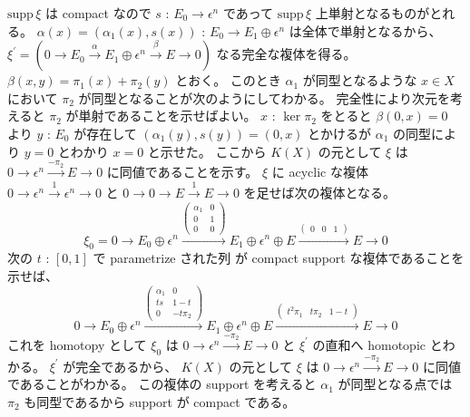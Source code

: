 \documentclass[dvipdfmx]{jsarticle}
\begin{document}
\begin{Proof}
\itemprof
  \(\text{supp} \, \xi\) は compact なので \(s\) : \(E_0 \to \epsilon^n\) であって \(\text{supp} \,\xi\) 上単射となるものがとれる。
  \(\alpha (x) = (\alpha_1(x) , s(x))\) : \(E_0 \to E_1 \oplus \epsilon^n\) は全体で単射となるから、
  \(
    \xi^\prime = (0 \to E_0 \overset{\alpha}{\to} E_1 \oplus \epsilon^n \overset{\beta}{\to} E \to 0)
  \)
  なる完全な複体を得る。
  \(\beta(x,y) = \pi_1(x) + \pi_2(y)\) とおく。
  このとき \(\alpha_1\) が同型となるような \(x \in X\) において \(\pi_2\) が同型となることが次のようにしてわかる。
  完全性により次元を考えると \(\pi_2\) が単射であることを示せばよい。
  \(x\) : \(\ker \pi_2\) をとると \(\beta(0,x) = 0\) より \(y\) : \(E_0\) が存在して \((\alpha_1(y) , s(y)) = (0,x)\) とかけるが \(\alpha_1\) の同型により \(y = 0\) とわかり \(x = 0\) と示せた。
\itemthen
  ここから \(K(X)\) の元として \(\xi\) は \(0 \to \epsilon^n \overset{- \pi_2}{\to} E \to 0\) に同値であることを示す。
  \(\xi\) に acyclic な複体　\(0 \to \epsilon^n \overset{1}{\to} \epsilon^n \to 0\) と \(0 \to 0 \to E \overset{1}{\to} E \to 0\) を足せば次の複体となる。
  \[\xi_0 = 0 \to E_0 \oplus \epsilon^n \overset{
    \begin{pmatrix}
      \alpha_1 & 0\\
      0 & 1 \\
      0 & 0
    \end{pmatrix}
  }{\to} E_1 \oplus \epsilon^n \oplus E \overset{
    \begin{pmatrix}
      0 & 0 & 1
    \end{pmatrix}
  }{\to} E \to 0\]
  次の \(t\) : \([0,1]\) で parametrize された列 が compact support な複体であることを示せば、
  \[0 \to E_0 \oplus \epsilon^n \overset{
    \begin{pmatrix}
      \alpha_1 & 0\\
      t s & 1 - t \\
      0 & - t \pi_2
    \end{pmatrix}
  }{\to} E_1 \oplus \epsilon^n \oplus E \overset{
    \begin{pmatrix}
      t^2 \pi_1 & t \pi_2 & 1 - t
    \end{pmatrix}
  }{\to} E \to 0\]
  これを homotopy として \(\xi_0\) は \(0 \to \epsilon^n \overset{-\pi_2}{\to} E \to 0\) と \(\xi ^\prime\) の直和へ homotopic とわかる。
  \(\xi^\prime\) が完全であるから、 \(K(X)\) の元として \(\xi\) は \(0 \to \epsilon^n \overset{-\pi_2}{\to} E \to 0\) に同値であることがわかる。
  この複体の support を考えると \(\alpha_1\) が同型となる点では \(\pi_2\) も同型であるから support が compact である。

\end{Proof}
\end{document}
